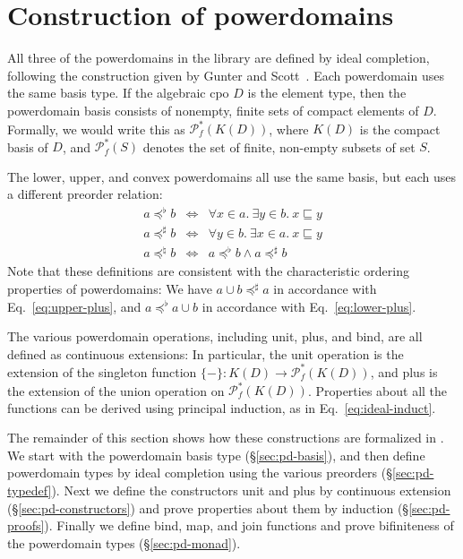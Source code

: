\section{Construction of powerdomains}
\label{sec:pd-implementation}

All three of the powerdomains in the library are defined by ideal completion, following the construction given by Gunter and Scott~\cite[\S5.2]{gunter90semantic}. Each powerdomain uses the same basis type. If the algebraic cpo $D$ is the element type, then the powerdomain basis consists of nonempty, finite sets of compact elements of $D$. Formally, we would write this as $\mathcal{P}_f^*(K(D))$, where $K(D)$ is the compact basis of $D$, and $\mathcal{P}_f^*(S)$ denotes the set of finite, non-empty subsets of set $S$.

The lower, upper, and convex powerdomains all use the same basis, but each uses a different preorder relation:
\begin{eqnarray}
a\preceq^{\flat}b & \iff & \forall x\in a.\ \exists y\in b.\ x\sqsubseteq y\nonumber \\
a\preceq^{\sharp}b & \iff & \forall y\in b.\ \exists x\in a.\ x\sqsubseteq y\label{eq:preorders}\\
a\preceq^{\natural}b & \iff & a\preceq^{\flat}b\wedge a\preceq^{\sharp}b\nonumber
\end{eqnarray}
%
Note that these definitions are consistent with the characteristic ordering properties of powerdomains: We have $a \cup b \preceq^{\sharp} a$ in accordance with Eq.~\eqref{eq:upper-plus}, and $a \preceq^{\flat} a \cup b$ in accordance with Eq.~\eqref{eq:lower-plus}.

The various powerdomain operations, including unit, plus, and bind, are all defined as continuous extensions: In particular, the unit operation is the extension of the singleton function $\{-\} : K(D) \to \mathcal{P}_f^*(K(D))$, and plus is the extension of the union operation on $\mathcal{P}_f^*(K(D))$. Properties about all the functions can be derived using principal induction, as in Eq.~\eqref{eq:ideal-induct}.

The remainder of this section shows how these constructions are formalized in . We start with the powerdomain basis type (\S\ref{sec:pd-basis}), and then define powerdomain types by ideal completion using the various preorders (\S\ref{sec:pd-typedef}). Next we define the constructors unit and plus by continuous extension (\S\ref{sec:pd-constructors}) and prove properties about them by induction (\S\ref{sec:pd-proofs}). Finally we define bind, map, and join functions and prove bifiniteness of the powerdomain types (\S\ref{sec:pd-monad}).

